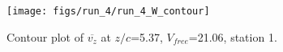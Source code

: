 \begin{figure}[H]
\centering
\texttt{[image: figs/run\_4/run\_4\_W\_contour]}
\caption{Contour plot of $\overline{v_{z}}$ at $z/c$=5.37, $V_{free}$=21.06, station 1.}
\label{fig:run_4_W_contour}
\end{figure}


